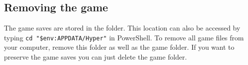\subsection{Removing the game}
The game saves are stored in the  folder.
This location can also be accessed by typing \texttt{cd "\$env:APPDATA/Hyper"} in PowerShell.
To remove all game files from your computer, remove this folder as well as the game folder.
If you want to preserve the game saves you can just delete the game folder.